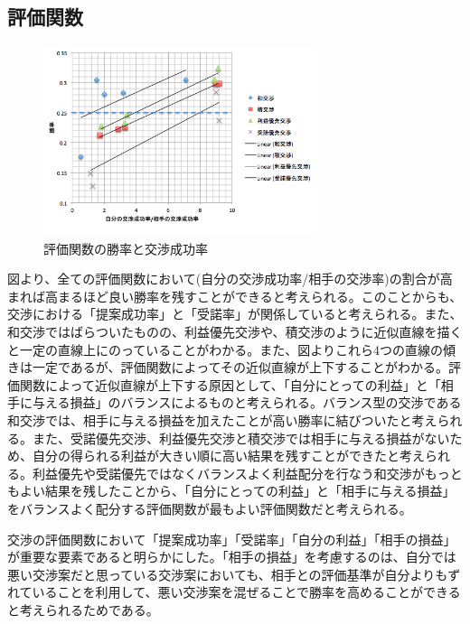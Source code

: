 \documentclass[a4, 10pt,dvipdfmx,twocolumn]{jsarticle}
\begin{document}
\subsection{評価関数}


\begin{figure}[h]
    \begin{center}
      \includegraphics[width=80mm]{img/relation_winrate.png}
    \end{center}
    \caption{評価関数の勝率と交渉成功率}
    \label{win_rate}
\end{figure}


図より、全ての評価関数において(自分の交渉成功率/相手の交渉率)の割合が高まれば高まるほど良い勝率を残すことができると考えられる。このことからも、交渉における「提案成功率」と「受諾率」が関係していると考えられる。また、和交渉ではばらついたものの、利益優先交渉や、積交渉のように近似直線を描くと一定の直線上にのっていることがわかる。また、図よりこれら4つの直線の傾きは一定であるが、評価関数によってその近似直線が上下することがわかる。評価関数によって近似直線が上下する原因として、「自分にとっての利益」と「相手に与える損益」のバランスによるものと考えられる。バランス型の交渉である和交渉では、相手に与える損益を加えたことが高い勝率に結びついたと考えられる。また、受諾優先交渉、利益優先交渉と積交渉では相手に与える損益がないため、自分の得られる利益が大きい順に高い結果を残すことができたと考えられる。利益優先や受諾優先ではなくバランスよく利益配分を行なう和交渉がもっともよい結果を残したことから、「自分にとっての利益」と「相手に与える損益」をバランスよく配分する評価関数が最もよい評価関数だと考えられる。

交渉の評価関数において「提案成功率」「受諾率」「自分の利益」「相手の損益」が重要な要素であると明らかにした。「相手の損益」を考慮するのは、自分では悪い交渉案だと思っている交渉案においても、相手との評価基準が自分よりもずれていることを利用して、悪い交渉案を混ぜることで勝率を高めることができると考えられるためである。
\end{document}
